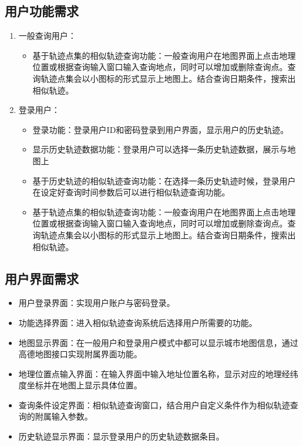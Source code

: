 \subsection{用户功能需求}
\label{subsec:user class functional requirements}
\begin{enumerate}
   \item 一般查询用户：
   \begin{itemize}
   		\item 基于轨迹点集的相似轨迹查询功能：一般查询用户在地图界面上点击地理位置或根据查询输入窗口输入查询地点，同时可以增加或删除查询点。查询轨迹点集会以小图标的形式显示上地图上。结合查询日期条件，搜索出相似轨迹。
   \end{itemize}
   \item 登录用户：
   \begin{itemize}
		\item 登录功能：登录用户ID和密码登录到用户界面，显示用户的历史轨迹。
		\item 显示历史轨迹数据功能：登录用户可以选择一条历史轨迹数据，展示与地图上
		\item 基于历史轨迹的相似轨迹查询功能：在选择一条历史轨迹时候，登录用户在设定好查询时间参数后可以进行相似轨迹查询功能。
		\item 基于轨迹点集的相似轨迹查询功能：一般查询用户在地图界面上点击地理位置或根据查询输入窗口输入查询地点，同时可以增加或删除查询点。查询轨迹点集会以小图标的形式显示上地图上。结合查询日期条件，搜索出相似轨迹。
   \end{itemize}
\end{enumerate}

\subsection{用户界面需求}
\label{subsec:external interface Requirements}
\begin{itemize}
	\item 用户登录界面：实现用户账户与密码登录。
	\item 功能选择界面：进入相似轨迹查询系统后选择用户所需要的功能。
	\item 地图显示界面：在一般用户和登录用户模式中都可以显示城市地图信息，通过高德地图\cite{AutoNavi}接口实现附属界面功能。
	\item 地理位置点输入界面：在输入界面中输入地址位置名称，显示对应的地理经纬度坐标并在地图上显示具体位置。
	\item 查询条件设定界面：相似轨迹查询窗口，结合用户自定义条件作为相似轨迹查询的附属输入参数。
	\item 历史轨迹显示界面：显示登录用户的历史轨迹数据条目。
\end{itemize}


